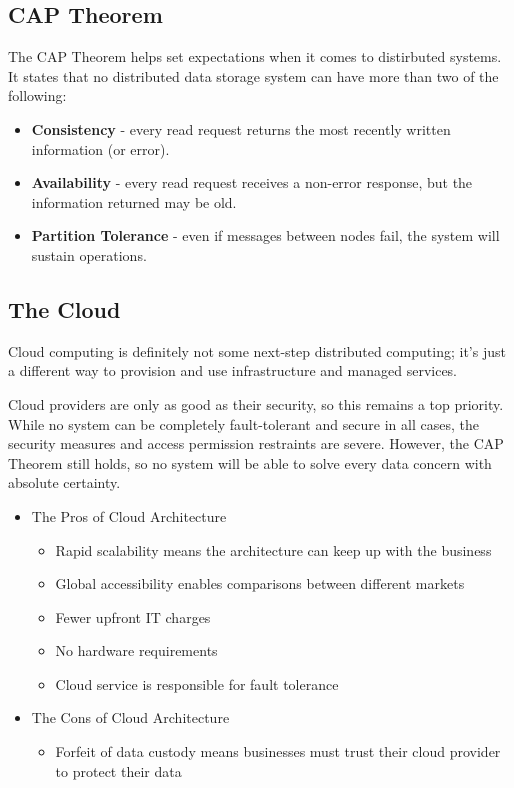 \documentclass[12pt,a4paper]{article}
\begin{document}
\subsection{CAP Theorem}

The CAP Theorem helps set expectations when it comes to distirbuted systems. It states that no distributed data storage system can have more than two of the following:

\begin{itemize}
	\item \textbf{Consistency} - every read request returns the most recently written information (or error).
	\item \textbf{Availability} - every read request receives a non-error response, but the information returned may be old.
	\item \textbf{Partition Tolerance} - even if messages between nodes fail, the system will sustain operations.
\end{itemize}

\subsection{The Cloud}

Cloud computing is definitely not some next-step distributed computing;
it's just a different way to provision and use infrastructure and managed services.


Cloud providers are only as good as their security, so this remains a top priority. While no system can be completely fault-tolerant and secure in all cases, the security measures and access permission restraints are severe. However, the CAP Theorem still holds, so no system will be able to solve every
data concern with absolute certainty.

\begin{itemize}

	\item The Pros of Cloud Architecture
		\begin{itemize}
			\item Rapid scalability means the architecture can keep up with the business
			\item Global accessibility enables comparisons between different markets
			\item Fewer upfront IT charges
			\item No hardware requirements
			\item Cloud service is responsible for fault tolerance
		\end{itemize}

	\item The Cons of Cloud Architecture

		\begin{itemize}
			\item Forfeit of data custody means businesses must 
				trust their cloud provider to protect their data
		\end{itemize}

\end{itemize}
\end{document}
